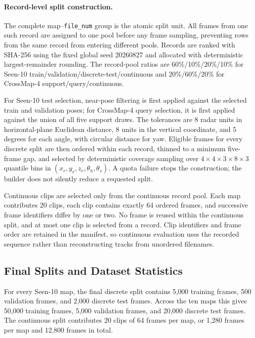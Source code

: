 \paragraph{Record-level split construction.}
The complete map--\texttt{file\_num} group is the atomic split unit.  All
frames from one such record are assigned to one pool before any frame
sampling, preventing rows from the same record from entering different
pools.  Records are ranked with SHA-256 using the
fixed global seed 20260827 and allocated with deterministic largest-remainder
rounding.  The record-pool ratios are 60\%/10\%/20\%/10\% for
Seen-10 train/validation/discrete-test/continuous and 20\%/60\%/20\% for
CrossMap-4 support/query/continuous.

For Seen-10 test selection, near-pose filtering is first applied against the
selected train and validation poses; for CrossMap-4 query selection, it is
first applied against the union of all five support draws.  The tolerances are
8 radar units in horizontal-plane Euclidean distance, 8 units in the vertical
coordinate, and 5 degrees for each angle, with circular distance for yaw.
Eligible frames for every discrete split are then ordered within each record,
thinned to a minimum five-frame gap, and selected by deterministic coverage
sampling over $4\times4\times3\times8\times3$ quantile bins in
$(x_r,y_r,z_r,\theta_h,\theta_v)$.  A quota failure stops the construction;
the builder does not silently reduce a requested split.

Continuous clips are selected only from the continuous record pool.  Each
map contributes 20 clips, each clip contains exactly 64 ordered frames, and
successive frame identifiers differ by one or two.  No frame is reused within
the continuous split, and at most one clip is selected from a record.  Clip
identifiers and frame order are retained in the manifest, so continuous
evaluation uses the recorded sequence rather than reconstructing tracks from
unordered filenames.

\subsection{Final Splits and Dataset Statistics}
\label{subsec:benchmark-splits}

For every Seen-10 map, the final discrete split contains 5,000 training
frames, 500 validation frames, and 2,000 discrete test frames.  Across the
ten maps this gives 50,000 training frames, 5,000 validation frames, and
20,000 discrete test frames.  The continuous split contributes 20 clips of
64 frames per map, or 1,280 frames per map and 12,800 frames in total.

